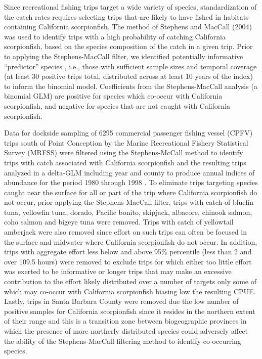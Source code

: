 \documentclass[12pt,]{article}
\begin{document}
Since recreational fishing trips target a wide variety of species,
standardization of the catch rates requires selecting trips that are
likely to have fished in habitats containing California scorpionfish.
The method of Stephens and MacCall (2004) was used to identify trips
with a high probability of catching California scorpionfish, based on
the species composition of the catch in a given trip. Prior to applying
the Stephens-MacCall filter, we identified potentially informative
``predictor'' species , i.e., those with sufficient sample sizes and
temporal coverage (at least 30 positive trips total, distributed across
at least 10 years of the index) to inform the binomial model.
Coefficients from the Stephens-MacCall analysis (a binomial GLM) are
positive for species which co-occur with California scorpionfish, and
negative for species that are not caught with California scorpionfish.

Data for dockside sampling of 6295 commercial passenger fishing vessel
(CPFV) trips south of Point Conception by the Marine Recreational
Fishery Statistical Survey (MRFSS) were filtered using the
Stephens-McCall method to identify trips with catch associated with
California scorpionfish and the resulting trips analyzed in a delta-GLM
including year and county to produce annual indices of abundance for the
period 1980 through 1998 . To eliminate trips targeting species caught
near the surface for all or part of the trip where California
scorpionfish do not occur, prior applying the Stephens-MacCall filter,
trips with catch of bluefin tuna, yellowfin tuna, dorado, Pacific
bonito, skipjack, albacore, chinook salmon, coho salmon and bigeye tuna
were removed. Trips with catch of yellowtail amberjack were also removed
since effort on such trips can often be focused in the surface and
midwater where California scorpionfish do not occur. In addition, trips
with aggregate effort less below and above 95\% percentile (less than 2
and over 109.5 hours) were removed to exclude trips for which either too
little effort was exerted to be informative or longer trips that may
make an excessive contribution to the effort likely distributed over a
number of targets only some of which may co-occur with California
scorpionfish biasing low the resulting CPUE. Lastly, trips in Santa
Barbara County were removed due the low number of positive samples for
California scorpionfish since it resides in the northern extent of their
range and this is a transition zone between biogeographic provinces in
which the presence of more northerly distributed species could adversely
affect the ability of the Stephens-MacCall filtering method to identify
co-occurring species.
\end{document}
